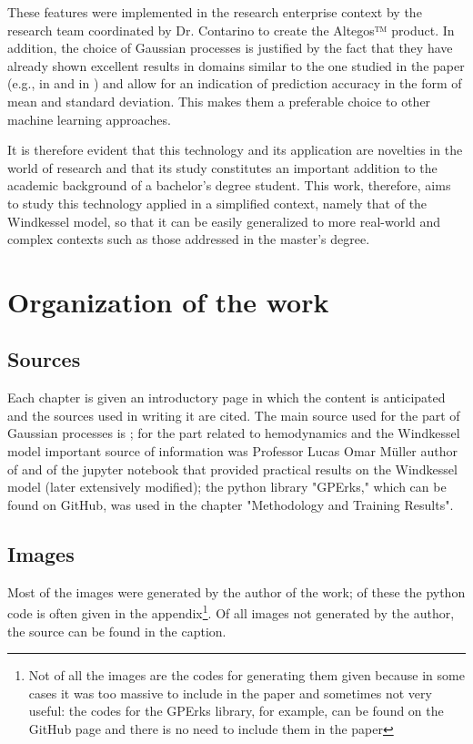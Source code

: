 These features were implemented in the research enterprise context by the research team coordinated by Dr. Contarino to create the Altegos™ product. In addition, the choice of Gaussian processes is justified by the fact that they have already shown excellent results in domains similar to the one studied in the paper (e.g., in \cite{doi:10.1098/rsta.2019.0334} and in \cite{Yuhn2022.03.10.483573}) and allow for an indication of prediction accuracy in the form of mean and standard deviation. This makes them a preferable choice to other machine learning approaches.


It is therefore evident that this technology and its application are novelties in the world of research and that its study constitutes an important addition to the academic background of a bachelor's degree student. This work, therefore, aims to study this technology applied in a simplified context, namely that of the Windkessel model, so that it can be easily generalized to more real-world and complex contexts such as those addressed in the master's degree. 

\newpage
\section{Organization of the work}
\subsection{Sources}
Each chapter is given an introductory page in which the content is anticipated and the sources used in writing it are cited.
The main source used for the part of Gaussian processes is \cite{rasmussen_gaussian_2006}; for the part related to hemodynamics and the Windkessel model important source of information was Professor Lucas Omar Müller author of \cite{ghitti_toro_müller_2022} and of the jupyter notebook that provided practical results on the Windkessel model (later extensively modified); the python library "GPErks," which can be found on GitHub, was used in the chapter "Methodology and Training Results".

\subsection{Images}
Most of the images were generated by the author of the work; of these the python code is often given in the appendix\footnote{Not of all the images are the codes for generating them given because in some cases it was too massive to include in the paper and sometimes not very useful: the codes for the GPErks library, for example, can be found on the GitHub page and there is no need to include them in the paper}. Of all images not generated by the author, the source can be found in the caption.


